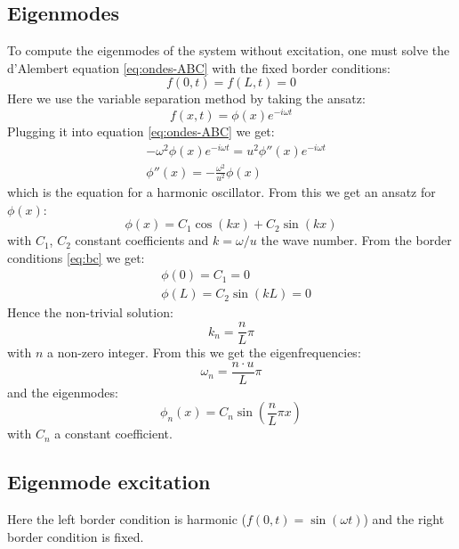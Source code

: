 \documentclass[a4paper,12pt,twoside]{article}
\begin{document}
    \subsection{Eigenmodes}
    To compute the eigenmodes of the system without excitation, one must solve the d'Alembert equation \eqref{eq:ondes-ABC} with the fixed border conditions:
    \begin{equation}
     f(0,t) = f(L,t) = 0
     \label{eq:bc}
    \end{equation}
    Here we use the variable separation method by taking the ansatz:
    \begin{equation*}
     f(x,t) = \phi(x)e^{-i\omega t}
    \end{equation*}
    Plugging it into equation \eqref{eq:ondes-ABC} we get:
    \begin{align*}
     &-\omega^2 \phi(x)e^{-i\omega t} = u^2 \phi''(x)e^{-i\omega t}\\
     &\phi''(x)=-\frac{\omega^2}{u^2}\phi(x)
    \end{align*}
    which is the equation for a harmonic oscillator. From this we get an ansatz for $\phi(x)$:
    \begin{equation*}
     \phi(x)=C_1\cos(kx)+C_2\sin(kx)
    \end{equation*}
    with $C_1$, $C_2$ constant coefficients and $k=\omega/u$ the wave number. From the border conditions \eqref{eq:bc} we get:
    \begin{align*}
     &\phi(0)=C_1=0\\
     &\phi(L)=C_2\sin(kL)=0
    \end{align*}
    Hence the non-trivial solution:
    \begin{equation*}
     k_n=\frac{n}{L}\pi
    \end{equation*}
    with $n$ a non-zero integer. From this we get the eigenfrequencies:
    \begin{equation}
     \boxed{\omega_n = \frac{n\cdot u}{L}\pi}
     \label{eq:eigenfreq}
    \end{equation}
    and the eigenmodes:
    \begin{equation}
     \boxed{\phi_n(x)=C_n\sin\left(\frac{n}{L}\pi x\right)}
     \label{eq:eigenmode}
    \end{equation}
    with $C_n$ a constant coefficient.

    \subsection{Eigenmode excitation}
    Here the left border condition is harmonic ($f(0,t)=\sin(\omega t)$) and the right border condition is fixed.
\end{document}
